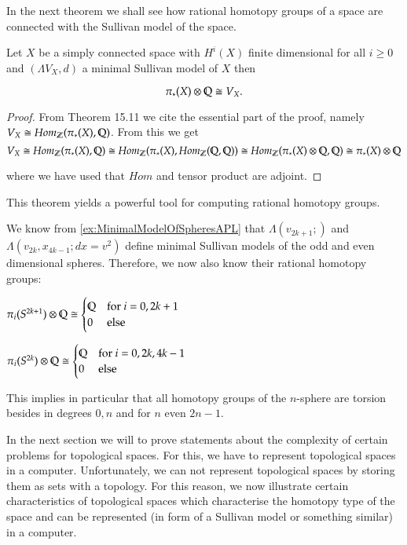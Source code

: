 In the next theorem we shall see how rational homotopy groups of a space are connected with 
the Sullivan model of the space.

\begin{Theorem}
\label{thm:MainTheoremOfRationalHomotopyTheory}
 Let $X$ be a simply connected space with $H^i(X)$ finite dimensional for all $i \geq 0$ and 
 $(\Lambda V_X, d)$ a minimal Sullivan model of $X$ then
 
 $$ \pi_*(X) \otimes \mathbb{Q} \cong V_X.$$
\end{Theorem}

\begin{proof}
 From  \cite{Felix2001} Theorem 15.11 we cite the essential part of the proof, namely $V_X \cong Hom_{\mathbb{Z}}(\pi_*(X), \mathbb{Q})$. 
 From this we get 
 $$ V_X \cong Hom_{\mathbb{Z}}(\pi_*(X), \mathbb{Q}) \cong Hom_{\mathbb{Z}}(\pi_*(X), Hom_{\mathbb{Z}}(\mathbb{Q}, \mathbb{Q})) \cong 
  Hom_{\mathbb{Z}}(\pi_*(X) \otimes \mathbb{Q}, \mathbb{Q}) \cong \pi_*(X) \otimes \mathbb{Q}$$
  
  where we have used that $Hom$ and tensor product are adjoint.
\end{proof}

This theorem yields a powerful tool for computing rational homotopy groups.
\begin{Example}
\label{ex:RationalHomotopyGroupsOfSpheres}
 We know from \ref{ex:MinimalModelOfSpheresAPL} that $\Lambda(v_{2k+1};)$ and $\Lambda(v_{2k}, x_{4k -1}; dx = v^2)$
 define  minimal Sullivan models of the odd and even dimensional spheres. Therefore, we now also know their rational homotopy groups:
 
 \begin{multicols}{2}
  $\pi_i(S^{2k+1}) \otimes \mathbb{Q} \cong
  \begin{cases}
  \mathbb{Q}  	&\text{for $i = 0, 2k+1$} \\
  0 	&\text{else}
  \end{cases}
  $
  
  \columnbreak
  
  $\pi_i(S^{2k}) \otimes \mathbb{Q} \cong
  \begin{cases}
  \mathbb{Q}  	&\text{for $i = 0, 2k, 4k -1 $} \\
  0 	&\text{else}
  \end{cases}
  $
 \end{multicols}
This implies in particular that all homotopy groups of the $n$-sphere are torsion besides in degrees $0, n$
and for $n$ even $2n -1$.
\end{Example}

In the next section we will to prove statements about the complexity of certain problems for topological spaces.
For this, we have to represent topological spaces in a computer. Unfortunately, we can not represent topological
spaces by storing them as sets with a topology. For this reason, we now illustrate certain characteristics of
topological spaces which characterise the homotopy type of the space and can
be represented (in form of a Sullivan model or something similar) in a computer.

